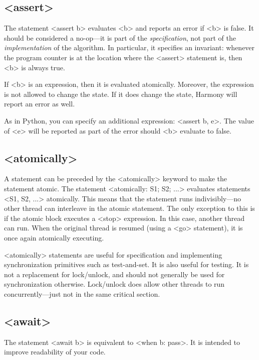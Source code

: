 \documentclass{report}
\begin{document}
\subsection*{<{assert}>}

The statement <{assert b}> evaluates <{b}> and reports an error
if <{b}> is false.  It should be considered a no-op---it is part of the
\emph{specification}, not part of the \emph{implementation} of the algorithm.
In particular, it specifies an invariant: whenever the program counter is
at the location where the <{assert}> statement is, then <{b}> is
always true.

If <{b}> is an expression, then it is evaluated atomically.
Moreover, the expression is not allowed to change the state.
If it does change the state, Harmony will report an error as well.

As in Python, you can specify an additional expression:
<{assert b, e}>.  The value of <{e}> will be reported as part
of the error should <{b}> evaluate to false.

\subsection*{<{atomically}>}

A statement can be preceded by the <{atomically}> keyword to
make the statement atomic.
The statement <{atomically: S1; S2; ...}> evaluates statements
<{S1, S2, ...}> atomically.
This means that the statement runs indivisibly---no other thread can
interleave in the atomic statement.  The only exception
to this is if the atomic block executes a <{stop}> expression.
In this case, another thread can run.  When the original thread
is resumed (using a <{go}> statement), it is once again
atomically executing.

<{atomically}> statements are useful for specification and
implementing synchronization primitives such as test-and-set.
It is also useful for testing.
It is not a replacement for lock/unlock, and should not generally be used
for synchronization otherwise.  Lock/unlock does allow other
threads to run concurrently---just not in the same critical section.

\subsection*{<{await}>}

The statement <{await b}> is equivalent to <{when b: pass}>.
It is intended to improve readability of your code.
\end{document}
